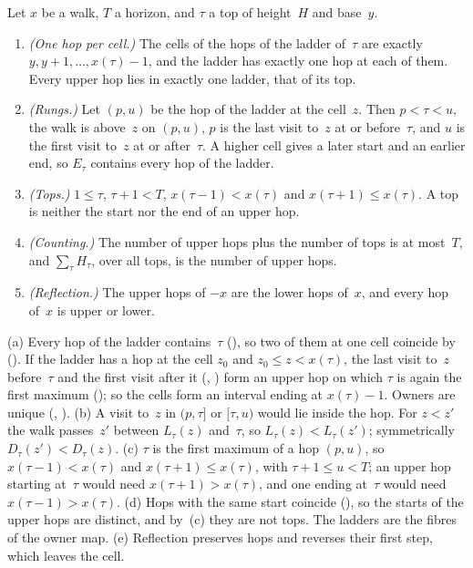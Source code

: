 \begin{lemma}[Ladders]\label{lem:ladder}
Let $x$ be a walk, $T$ a horizon, and $\tau$ a top of height~$H$ and base~$y$.
\begin{enumerate}[label=(\alph*)]
\item \emph{(One hop per cell.)} The cells of the hops of the ladder of~$\tau$ are exactly $y,y+1,\dots,x(\tau)-1$, and the
ladder has exactly one hop at each of them. Every upper hop lies in exactly one ladder, that of its top.
\item \emph{(Rungs.)} Let $(p,u)$ be the hop of the ladder at the cell~$z$. Then $p<\tau<u$, the walk is above~$z$ on
$(p,u)$, $p$ is the last visit to~$z$ at or before~$\tau$, and $u$ is the first visit to~$z$ at or after~$\tau$. A higher cell
gives a later start and an earlier end, so $E_\tau$ contains every hop of the ladder.
\item \emph{(Tops.)} $1\le\tau$, $\tau+1<T$, $x(\tau-1)<x(\tau)$ and $x(\tau+1)\le x(\tau)$. A top is neither the start nor
the end of an upper hop.
\item \emph{(Counting.)} The number of upper hops plus the number of tops is at most~$T$, and $\sum_\tau H_\tau$, over all
tops, is the number of upper hops.
\item \emph{(Reflection.)} The upper hops of $-x$ are the lower hops of~$x$, and every hop of~$x$ is upper or lower.
\end{enumerate}
\end{lemma}

\begin{outline}
(a) Every hop of the ladder contains~$\tau$ (), so two of them at one cell coincide by
 (). If the ladder has a hop at the cell $z_0$ and $z_0\le z<x(\tau)$,
the last visit to~$z$ before~$\tau$ and the first visit after it (, ) form an
upper hop on which $\tau$ is again the first maximum (); so the cells form an interval ending at
$x(\tau)-1$. Owners are unique (, ). (b) A visit to~$z$ in $(p,\tau]$ or
$[\tau,u)$ would lie inside the hop. For $z<z'$ the walk passes~$z'$ between $L_\tau(z)$ and~$\tau$, so $L_\tau(z)<L_\tau(z')$;
symmetrically $D_\tau(z')<D_\tau(z)$. (c) $\tau$ is the first maximum of a hop $(p,u)$, so $x(\tau-1)<x(\tau)$ and
$x(\tau+1)\le x(\tau)$, with $\tau+1\le u<T$; an upper hop starting at~$\tau$ would need $x(\tau+1)>x(\tau)$, and one ending
at~$\tau$ would need $x(\tau-1)>x(\tau)$. (d) Hops with the same start coincide (), so the
starts of the upper hops are distinct, and by~(c) they are not tops. The ladders are the fibres of the owner map.
(e) Reflection preserves hops and reverses their first step, which leaves the cell.
\end{outline}

